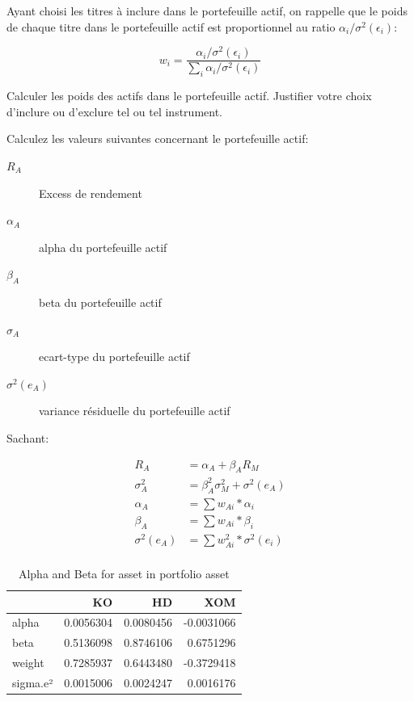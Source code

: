 \documentclass[
]{article}
\begin{document}
Ayant choisi les titres à inclure dans le portefeuille actif, on
rappelle que le poids de chaque titre dans le portefeuille actif est
proportionnel au ratio \(\alpha_i/\sigma^2(\epsilon_i)\):

\[
w_i = \frac{\alpha_i/\sigma^2(\epsilon_i)}{\sum_i \alpha_i/\sigma^2(\epsilon_i)}
\]

Calculer les poids des actifs dans le portefeuille actif. Justifier
votre choix d'inclure ou d'exclure tel ou tel instrument.

Calculez les valeurs suivantes concernant le portefeuille actif:

\begin{description}
\item[$R_A$] Excess de rendement
\item[$\alpha_A$] alpha du portefeuille actif
\item[$\beta_A$]  beta du portefeuille actif
\item[$\sigma_A$] ecart-type du portefeuille actif
\item[$\sigma^2(e_A)$] variance résiduelle du portefeuille actif
\end{description}

Sachant:

\[
\begin{aligned}
R_A & = \alpha_A + \beta_A R_M \\
\sigma^2_A & = \beta^2_A \sigma^2_M + \sigma^2(e_A)  \\
\alpha_A &= \sum{w_{Ai}}*\alpha_i \\
\beta_A &= \sum{w_{Ai}}*\beta_i \\
\sigma^2(e_A) &= \sum{w_{Ai}^2}*\sigma^2(e_i)\\
\end{aligned}
\]

\begin{table}[H]

\caption{\label{tab:unnamed-chunk-10}Alpha and Beta for asset in portfolio asset}
\centering
\begin{tabular}[t]{lrrr}
\toprule
  & KO & HD & XOM\\
\midrule
alpha & 0.0056304 & 0.0080456 & -0.0031066\\
beta & 0.5136098 & 0.8746106 & 0.6751296\\
weight & 0.7285937 & 0.6443480 & -0.3729418\\
sigma.e² & 0.0015006 & 0.0024247 & 0.0016176\\
\bottomrule
\end{tabular}
\end{table}
\end{document}
